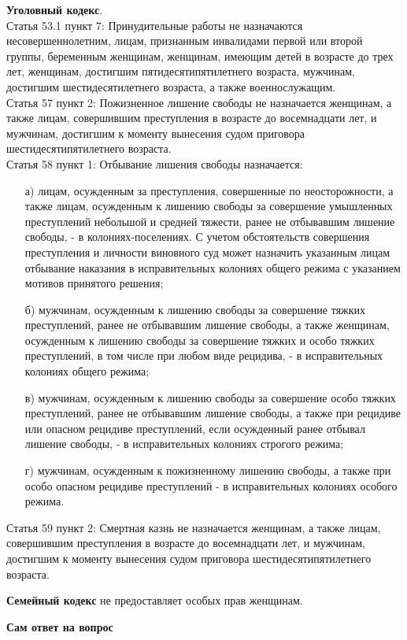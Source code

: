 \documentclass[a4paper, 12pt]{article}
\begin{document}
\textbf{Уголовный кодекс}. 
\\ Статья 53.1 пункт 7: Принудительные работы не назначаются несовершеннолетним, лицам, признанным инвалидами первой или второй группы, беременным женщинам, женщинам, имеющим детей в возрасте до трех лет, женщинам, достигшим пятидесятипятилетнего возраста, мужчинам, достигшим шестидесятилетнего возраста, а также военнослужащим.
\\ Статья 57 пункт 2: Пожизненное лишение свободы не назначается женщинам, а также лицам, совершившим преступления в возрасте до восемнадцати лет, и мужчинам, достигшим к моменту вынесения судом приговора шестидесятипятилетнего возраста.
\\ Статья 58 пункт 1: Отбывание лишения свободы назначается:
\begin{itemize}
\item[а)] лицам, осужденным за преступления, совершенные по неосторожности, а также лицам, осужденным к лишению свободы за совершение умышленных преступлений небольшой и средней тяжести, ранее не отбывавшим лишение свободы, - в колониях-поселениях. С учетом обстоятельств совершения преступления и личности виновного суд может назначить указанным лицам отбывание наказания в исправительных колониях общего режима с указанием мотивов принятого решения;
\item[б)] мужчинам, осужденным к лишению свободы за совершение тяжких преступлений, ранее не отбывавшим лишение свободы, а также женщинам, осужденным к лишению свободы за совершение тяжких и особо тяжких преступлений, в том числе при любом виде рецидива, - в исправительных колониях общего режима;
\item[в)] мужчинам, осужденным к лишению свободы за совершение особо тяжких преступлений, ранее не отбывавшим лишение свободы, а также при рецидиве или опасном рецидиве преступлений, если осужденный ранее отбывал лишение свободы, - в исправительных колониях строгого режима;
\item[г)] мужчинам, осужденным к пожизненному лишению свободы, а также при особо опасном рецидиве преступлений - в исправительных колониях особого режима.
\end{itemize}
Статья 59 пункт 2: Смертная казнь не назначается женщинам, а также лицам, совершившим преступления в возрасте до восемнадцати лет, и мужчинам, достигшим к моменту вынесения судом приговора шестидесятипятилетнего возраста.

\textbf{Семейный кодекс} не предоставляет особых прав женщинам. 

\null \hfill \textbf{Сам ответ на вопрос} \hfill \null
\end{document}
